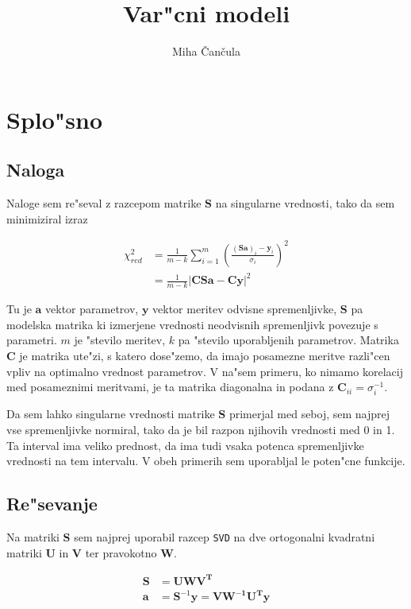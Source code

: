 \documentclass[a4paper,10pt]{article}
\title{Var"cni modeli}
\author{Miha \v Can\v cula}
\begin{document}
\maketitle

\section{Splo"sno}

\subsection{Naloga}

Naloge sem re"seval z razcepom matrike $\mathbf{S}$ na singularne vrednosti, tako da sem minimiziral izraz 

\begin{align}
 \chi^2_{red} &= \frac{1}{m-k} \sum_{i=1}^m \left(\frac{(\mathbf{Sa})_i - \mathbf{y}_i}{\sigma_i}\right)^2 \\
  &= \frac{1}{m-k} \left|\mathbf{CSa} - \mathbf{Cy}\right|^2
\end{align}

Tu je $\mathbf{a}$ vektor parametrov, $\mathbf{y}$ vektor meritev odvisne spremenljivke, $\mathbf{S}$ pa modelska matrika ki izmerjene vrednosti neodvisnih spremenljivk povezuje s parametri. $m$ je "stevilo meritev, $k$ pa "stevilo uporabljenih parametrov. Matrika $\mathbf{C}$ je matrika ute"zi, s katero dose"zemo, da imajo posamezne meritve razli"cen vpliv na optimalno vrednost parametrov. V na"sem primeru, ko nimamo korelacij med posameznimi meritvami, je ta matrika diagonalna in podana z $\mathbf{C}_{ii} = \sigma_i^{-1}$. 

Da sem lahko singularne vrednosti matrike $\mathbf{S}$ primerjal med seboj, sem najprej vse spremenljivke normiral, tako da je bil razpon njihovih vrednosti med 0 in 1. Ta interval ima veliko prednost, da ima tudi vsaka potenca spremenljivke vrednosti na tem intervalu. V obeh primerih sem uporabljal le poten"cne funkcije. 

\subsection{Re"sevanje}

Na matriki $\mathbf{S}$ sem najprej uporabil razcep \texttt{SVD} na dve ortogonalni kvadratni matriki $\mathbf{U}$ in $\mathbf{V}$ ter pravokotno $\mathbf{W}$. 

\begin{align}
 \mathbf{S} &= \mathbf{U W V^T} \\
 \mathbf{a} &= \mathbf{S}^{-1}\mathbf{y} = \mathbf{V W^{-1} U^T y}
\end{align}
\end{document}
